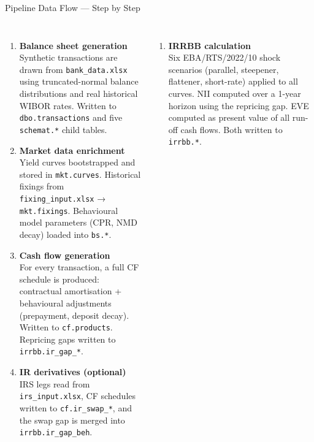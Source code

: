 \documentclass[aspectratio=169,10pt]{beamer}
\begin{document}
\begin{frame}{Pipeline Data Flow — Step by Step}

  \begin{columns}[T]
      \small
      \begin{enumerate}
        \item[\textbf{1.}] \textbf{Balance sheet generation}\\
          Synthetic transactions are drawn from \texttt{bank\_data.xlsx}
          using truncated-normal balance distributions and real historical
          WIBOR rates.
          Written to \texttt{dbo.transactions} and five
          \texttt{schemat.*} child tables.

        \vspace{4pt}
        \item[\textbf{2.}] \textbf{Market data enrichment}\\
          Yield curves bootstrapped and stored in \texttt{mkt.curves}.
          Historical fixings from \texttt{fixing\_input.xlsx} → \texttt{mkt.fixings}.
          Behavioural model parameters (CPR, NMD decay) loaded into \texttt{bs.*}.

        \vspace{4pt}
        \item[\textbf{3.}] \textbf{Cash flow generation}\\
          For every transaction, a full CF schedule is produced:
          contractual amortisation + behavioural adjustments
          (prepayment, deposit decay).
          Written to \texttt{cf.products}.
          Repricing gaps written to \texttt{irrbb.ir\_gap\_*}.

        \vspace{4pt}
        \item[\textbf{4.}] \textbf{IR derivatives (optional)}\\
          IRS legs read from \texttt{irs\_input.xlsx},
          CF schedules written to \texttt{cf.ir\_swap\_*},
          and the swap gap is merged into \texttt{irrbb.ir\_gap\_beh}.
      \end{enumerate}

      \small
      \begin{enumerate}
        \item[\textbf{5.}] \textbf{IRRBB calculation}\\
          Six EBA/RTS/2022/10 shock scenarios
          (parallel, steepener, flattener, short-rate)
          applied to all curves.
          NII computed over a 1-year horizon using the repricing gap.
          EVE computed as present value of all run-off cash flows.
          Both written to \texttt{irrbb.*}.


\end{enumerate}
\end{columns}
\end{frame}
\end{document}
